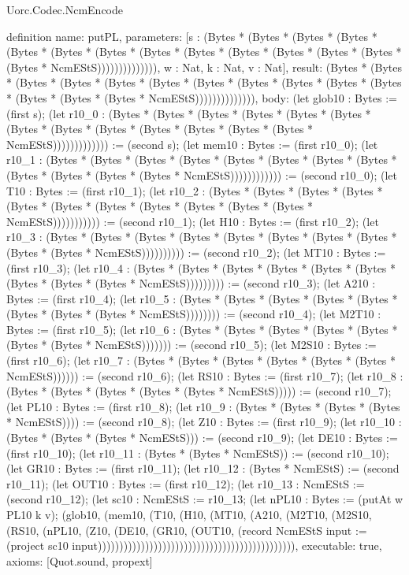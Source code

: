 \begin{lexlean}{Uorc.Codec.NcmEncode}
\begin{semanticmodule}
definition{
  name: putPL,
  parameters: [s : (Bytes * (Bytes * (Bytes * (Bytes * (Bytes * (Bytes * (Bytes * (Bytes * (Bytes * (Bytes * (Bytes * (Bytes * (Bytes * (Bytes * NcmEStS)))))))))))))), w : Nat, k : Nat, v : Nat],
  result: (Bytes * (Bytes * (Bytes * (Bytes * (Bytes * (Bytes * (Bytes * (Bytes * (Bytes * (Bytes * (Bytes * (Bytes * (Bytes * (Bytes * NcmEStS)))))))))))))),
  body: (let glob10 : Bytes := (first s); (let r10_0 : (Bytes * (Bytes * (Bytes * (Bytes * (Bytes * (Bytes * (Bytes * (Bytes * (Bytes * (Bytes * (Bytes * (Bytes * (Bytes * NcmEStS))))))))))))) := (second s); (let mem10 : Bytes := (first r10_0); (let r10_1 : (Bytes * (Bytes * (Bytes * (Bytes * (Bytes * (Bytes * (Bytes * (Bytes * (Bytes * (Bytes * (Bytes * (Bytes * NcmEStS)))))))))))) := (second r10_0); (let T10 : Bytes := (first r10_1); (let r10_2 : (Bytes * (Bytes * (Bytes * (Bytes * (Bytes * (Bytes * (Bytes * (Bytes * (Bytes * (Bytes * (Bytes * NcmEStS))))))))))) := (second r10_1); (let H10 : Bytes := (first r10_2); (let r10_3 : (Bytes * (Bytes * (Bytes * (Bytes * (Bytes * (Bytes * (Bytes * (Bytes * (Bytes * (Bytes * NcmEStS)))))))))) := (second r10_2); (let MT10 : Bytes := (first r10_3); (let r10_4 : (Bytes * (Bytes * (Bytes * (Bytes * (Bytes * (Bytes * (Bytes * (Bytes * (Bytes * NcmEStS))))))))) := (second r10_3); (let A210 : Bytes := (first r10_4); (let r10_5 : (Bytes * (Bytes * (Bytes * (Bytes * (Bytes * (Bytes * (Bytes * (Bytes * NcmEStS)))))))) := (second r10_4); (let M2T10 : Bytes := (first r10_5); (let r10_6 : (Bytes * (Bytes * (Bytes * (Bytes * (Bytes * (Bytes * (Bytes * NcmEStS))))))) := (second r10_5); (let M2S10 : Bytes := (first r10_6); (let r10_7 : (Bytes * (Bytes * (Bytes * (Bytes * (Bytes * (Bytes * NcmEStS)))))) := (second r10_6); (let RS10 : Bytes := (first r10_7); (let r10_8 : (Bytes * (Bytes * (Bytes * (Bytes * (Bytes * NcmEStS))))) := (second r10_7); (let PL10 : Bytes := (first r10_8); (let r10_9 : (Bytes * (Bytes * (Bytes * (Bytes * NcmEStS)))) := (second r10_8); (let Z10 : Bytes := (first r10_9); (let r10_10 : (Bytes * (Bytes * (Bytes * NcmEStS))) := (second r10_9); (let DE10 : Bytes := (first r10_10); (let r10_11 : (Bytes * (Bytes * NcmEStS)) := (second r10_10); (let GR10 : Bytes := (first r10_11); (let r10_12 : (Bytes * NcmEStS) := (second r10_11); (let OUT10 : Bytes := (first r10_12); (let r10_13 : NcmEStS := (second r10_12); (let sc10 : NcmEStS := r10_13; (let nPL10 : Bytes := (putAt w PL10 k v); (glob10, (mem10, (T10, (H10, (MT10, (A210, (M2T10, (M2S10, (RS10, (nPL10, (Z10, (DE10, (GR10, (OUT10, (record NcmEStS {input := (project sc10 input)}))))))))))))))))))))))))))))))))))))))))))))),
  executable: true,
  axioms: [Quot.sound, propext]
}


\end{semanticmodule}
\end{lexlean}
